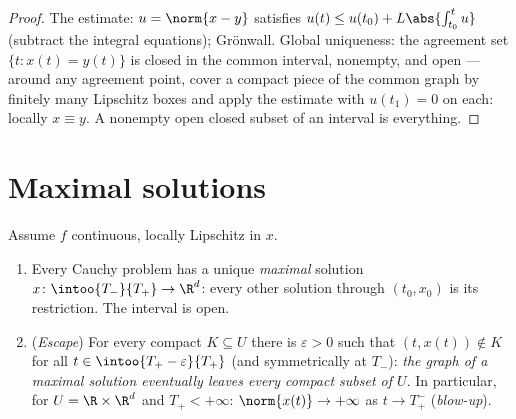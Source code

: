 \begin{proof}
The estimate: $u = \norm{x - y}$ satisfies $u(t) \leq u(t_0)
+ L\abs{\int_{t_0}^tu}$ (subtract the integral equations);
Gr\"onwall. Global uniqueness: the agreement set $\{t : x(t)
= y(t)\}$ is closed in the common interval, nonempty, and
open --- around any agreement point, cover a compact piece of
the common graph by finitely many Lipschitz boxes and apply
the estimate with $u(t_1) = 0$ on each: locally $x \equiv y$.
A nonempty open closed subset of an interval is everything.
\end{proof}

\section{Maximal solutions}

\begin{theorem}
\label{thm:b3:ode:maximal}
Assume $f$ continuous, locally Lipschitz in $x$.
\begin{enumerate}
  \item Every Cauchy problem has a unique \emph{maximal}
        solution $x \colon \intoo{T_-}{T_+} \to \R^d$: every
        other solution through $(t_0, x_0)$ is its
        restriction. The interval is open.
  \item (\emph{Escape}) For every compact $K \subseteq U$
        there is $\varepsilon > 0$ such that $(t, x(t)) \notin
        K$ for all $t \in \intoo{T_+ - \varepsilon}{T_+}$ (and
        symmetrically at $T_-$): \emph{the graph of a maximal
        solution eventually leaves every compact subset of
        $U$}. In particular,
        for $U = \R\times\R^d$ and $T_+ < +\infty$:
        $\norm{x(t)} \to +\infty$ as $t \to T_+^-$
        (\emph{blow-up}).
\end{enumerate}
\end{theorem}


